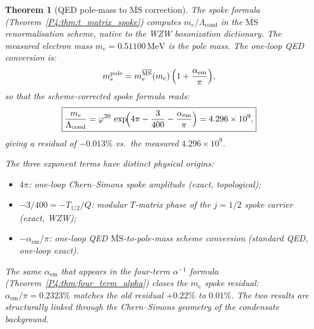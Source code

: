 \documentclass[11pt,a4paper]{article}
\newtheorem{theorem}{Theorem}[section]
\theoremstyle{definition}
\theoremstyle{remark}
\newcommand{\vp}{\varphi}
\newcommand{\aem}{\alpha_{\mathrm{em}}}
\newcommand{\Lcond}{\Lambda_{\mathrm{cond}}}
\begin{document}
\begin{theorem}[QED pole-mass to $\overline{\mathrm{MS}}$ correction]
\label{P4:thm:msbar_pole}
The spoke formula (Theorem~\ref{P4:thm:t_matrix_spoke}) computes
$m_e/\Lcond$ in the $\overline{\mathrm{MS}}$ renormalisation scheme,
native to the WZW bosonization dictionary.
The measured electron mass $m_e = 0.51100\,\mathrm{MeV}$ is the
\emph{pole mass}. The one-loop QED conversion is:
\begin{equation}
  m_e^{\mathrm{pole}} = m_e^{\overline{\mathrm{MS}}}(m_e)\,
  \Bigl(1 + \frac{\aem}{\pi}\Bigr),
  \label{P4:eq:pole_msbar}
\end{equation}
so that the scheme-corrected spoke formula reads:
\begin{equation}
  \boxed{
  \frac{m_e}{\Lcond} = \vp^{20}\,\exp\!\Bigl(
    4\pi - \frac{3}{400} - \frac{\aem}{\pi}\Bigr)
  = 4.296\times10^9,
  }
  \label{P4:eq:spoke_pole_corrected}
\end{equation}
giving a residual of $-0.013\%$ vs.\ the measured $4.296\times10^9$.

The three exponent terms have distinct physical origins:
\begin{itemize}[noitemsep]
  \item $4\pi$: one-loop Chern--Simons spoke amplitude (exact, topological);
  \item $-3/400 = -T_{1/2}/Q$: modular $T$-matrix phase of the
    $j=1/2$ spoke carrier (exact, WZW);
  \item $-\aem/\pi$: one-loop QED $\overline{\mathrm{MS}}$-to-pole-mass
    scheme conversion (standard QED, one-loop exact).
\end{itemize}
The same $\aem$ that appears in the four-term $\alpha^{-1}$ formula
(Theorem~\ref{P4:thm:four_term_alpha}) closes the $m_e$ spoke residual:
$\aem/\pi = 0.2323\%$ matches the old residual $+0.22\%$ to $0.01\%$.
The two results are structurally linked through the Chern--Simons
geometry of the condensate background.
\end{theorem}
\end{document}
